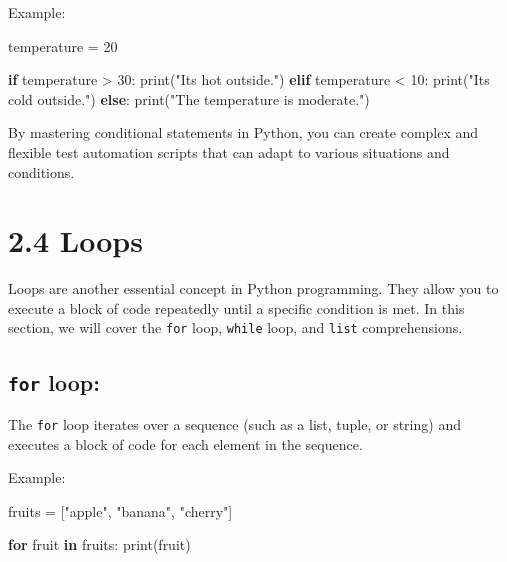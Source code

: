 \documentclass[
  paper=a4,
  ,captions=tableheading
]{scrartcl}
\newenvironment{Shaded}{}{}
\newcommand{\BuiltInTok}[1]{\textcolor[rgb]{0.00,0.50,0.00}{#1}}
\newcommand{\ControlFlowTok}[1]{\textcolor[rgb]{0.00,0.44,0.13}{\textbf{#1}}}
\newcommand{\DecValTok}[1]{\textcolor[rgb]{0.25,0.63,0.44}{#1}}
\newcommand{\KeywordTok}[1]{\textcolor[rgb]{0.00,0.44,0.13}{\textbf{#1}}}
\newcommand{\NormalTok}[1]{#1}
\newcommand{\OperatorTok}[1]{\textcolor[rgb]{0.40,0.40,0.40}{#1}}
\newcommand{\StringTok}[1]{\textcolor[rgb]{0.25,0.44,0.63}{#1}}
\begin{document}
Example:

\begin{Shaded}
\begin{Highlighting}[]
\NormalTok{temperature }\OperatorTok{=} \DecValTok{20}

\ControlFlowTok{if}\NormalTok{ temperature }\OperatorTok{\textgreater{}} \DecValTok{30}\NormalTok{:}
    \BuiltInTok{print}\NormalTok{(}\StringTok{"It\textquotesingle{}s hot outside."}\NormalTok{)}
\ControlFlowTok{elif}\NormalTok{ temperature }\OperatorTok{\textless{}} \DecValTok{10}\NormalTok{:}
    \BuiltInTok{print}\NormalTok{(}\StringTok{"It\textquotesingle{}s cold outside."}\NormalTok{)}
\ControlFlowTok{else}\NormalTok{:}
    \BuiltInTok{print}\NormalTok{(}\StringTok{"The temperature is moderate."}\NormalTok{)}
\end{Highlighting}
\end{Shaded}

By mastering conditional statements in Python, you can create complex
and flexible test automation scripts that can adapt to various
situations and conditions.

\hypertarget{loops}{%
\section{2.4 Loops}\label{loops}}

Loops are another essential concept in Python programming. They allow
you to execute a block of code repeatedly until a specific condition is
met. In this section, we will cover the \texttt{for} loop,
\texttt{while} loop, and \texttt{list} comprehensions.

\hypertarget{for-loop}{%
\subsection{\texorpdfstring{\texttt{for}
loop:}{for loop:}}\label{for-loop}}

The \texttt{for} loop iterates over a sequence (such as a list, tuple,
or string) and executes a block of code for each element in the
sequence.

Example:

\begin{Shaded}
\begin{Highlighting}[]
\NormalTok{fruits }\OperatorTok{=}\NormalTok{ [}\StringTok{"apple"}\NormalTok{, }\StringTok{"banana"}\NormalTok{, }\StringTok{"cherry"}\NormalTok{]}

\ControlFlowTok{for}\NormalTok{ fruit }\KeywordTok{in}\NormalTok{ fruits:}
    \BuiltInTok{print}\NormalTok{(fruit)}
\end{Highlighting}
\end{Shaded}
\end{document}
